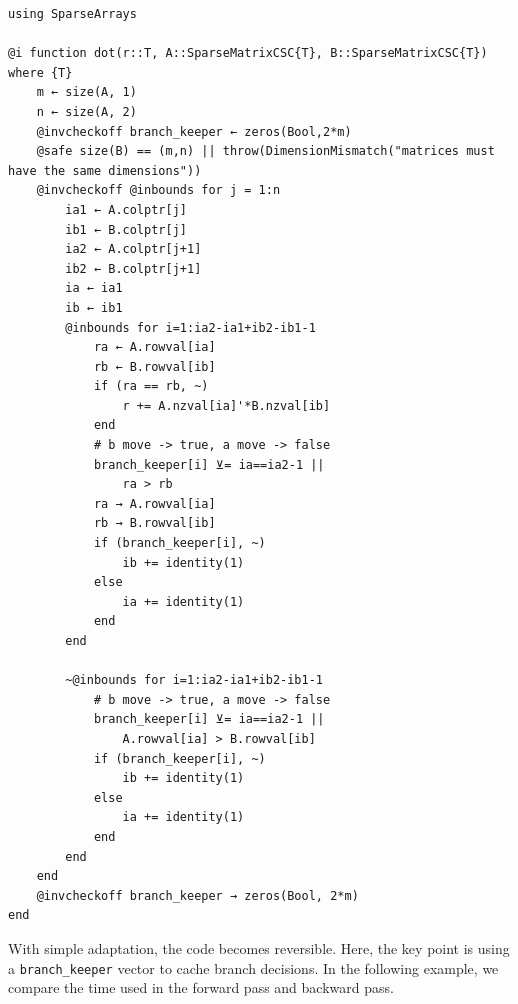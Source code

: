 \documentclass{article}
\newcommand{\<}{\langle}
\renewcommand{\>}{\rangle}
\theoremstyle{definition}\newtheorem{definition}{\textit{Definition}}
\begin{document}
\begin{minipage}{\columnwidth}
\begin{lstlisting}[multicols=2]
using SparseArrays

@i function dot(r::T, A::SparseMatrixCSC{T}, B::SparseMatrixCSC{T}) where {T}
    m ← size(A, 1)
    n ← size(A, 2)
    @invcheckoff branch_keeper ← zeros(Bool,2*m)
    @safe size(B) == (m,n) || throw(DimensionMismatch("matrices must have the same dimensions"))
    @invcheckoff @inbounds for j = 1:n
        ia1 ← A.colptr[j]
        ib1 ← B.colptr[j]
        ia2 ← A.colptr[j+1]
        ib2 ← B.colptr[j+1]
        ia ← ia1
        ib ← ib1
        @inbounds for i=1:ia2-ia1+ib2-ib1-1
            ra ← A.rowval[ia]
            rb ← B.rowval[ib]
            if (ra == rb, ~)
                r += A.nzval[ia]'*B.nzval[ib]
            end
            # b move -> true, a move -> false
            branch_keeper[i] ⊻= ia==ia2-1 ||
                ra > rb
            ra → A.rowval[ia]
            rb → B.rowval[ib]
            if (branch_keeper[i], ~)
                ib += identity(1)
            else
                ia += identity(1)
            end
        end

        ~@inbounds for i=1:ia2-ia1+ib2-ib1-1
            # b move -> true, a move -> false
            branch_keeper[i] ⊻= ia==ia2-1 ||
                A.rowval[ia] > B.rowval[ib]
            if (branch_keeper[i], ~)
                ib += identity(1)
            else
                ia += identity(1)
            end
        end
    end
    @invcheckoff branch_keeper → zeros(Bool, 2*m)
end
\end{lstlisting}
\end{minipage}

With simple adaptation, the code becomes reversible.
Here, the key point is using a \texttt{branch\_keeper} vector to cache branch decisions.
In the following example, we compare the time used in the forward pass and backward pass.
\end{document}
